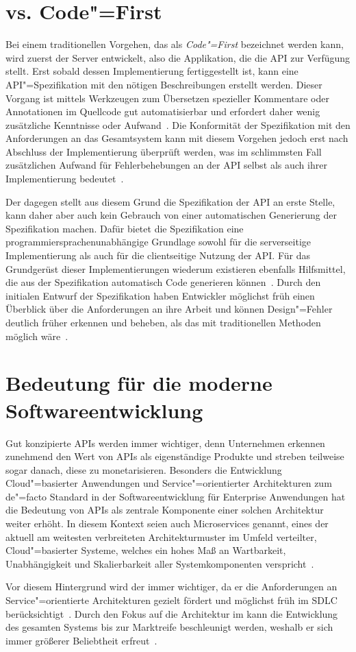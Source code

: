 \section{\AF vs. Code"=First}
Bei einem traditionellen Vorgehen, das als \emph{Code"=First} bezeichnet werden kann, wird zuerst der Server entwickelt, also die Applikation, die die \ac{API} zur Verfügung stellt.
Erst sobald dessen Implementierung fertiggestellt ist, kann eine \ac{API}"=Spezifikation mit den nötigen Beschreibungen erstellt werden.
Dieser Vorgang ist mittels Werkzeugen zum Übersetzen spezieller Kommentare oder Annotationen im Quellcode gut automatisierbar und erfordert daher wenig zusätzliche Kenntnisse oder Aufwand~\cite{ope24}.
Die Konformität der Spezifikation mit den Anforderungen an das Gesamtsystem kann mit diesem Vorgehen jedoch erst nach Abschluss der Implementierung überprüft werden, was im schlimmsten Fall zusätzlichen Aufwand für Fehlerbehebungen an der \ac{API} selbst als auch ihrer Implementierung bedeutet~\cite{vol22}.

Der \AFA dagegen stellt \ua aus diesem Grund die Spezifikation der \ac{API} an erste Stelle, kann daher aber auch kein Gebrauch von einer automatischen Generierung der Spezifikation machen.
Dafür bietet die Spezifikation eine programmiersprachenunabhängige Grundlage sowohl für die serverseitige Implementierung als auch für die clientseitige Nutzung der \ac{API}.
Für das Grundgerüst dieser Implementierungen wiederum existieren ebenfalls Hilfsmittel, die aus der Spezifikation automatisch Code generieren können~\cite{ope24}.
Durch den initialen Entwurf der Spezifikation haben Entwickler möglichst früh einen Überblick über die Anforderungen an ihre Arbeit und können Design"=Fehler deutlich früher erkennen und beheben, als das mit traditionellen Methoden möglich wäre~\cite[1627]{cha21}.

\section{Bedeutung für die moderne Softwareentwicklung}
Gut konzipierte \acp{API} werden immer wichtiger, denn Unternehmen erkennen zunehmend den Wert von \acp{API} als eigenständige Produkte und streben teilweise sogar danach, diese zu monetarisieren.
Besonders die Entwicklung Cloud"=basierter Anwendungen und Service"=orientierter Architekturen zum de"=facto Standard in der Softwareentwicklung für Enterprise Anwendungen hat die Bedeutung von \acp{API} als zentrale Komponente einer solchen Architektur weiter erhöht.
In diesem Kontext seien auch Microservices genannt, eines der aktuell am weitesten verbreiteten Architekturmuster im Umfeld verteilter, Cloud"=basierter Systeme, welches ein hohes Maß an Wartbarkeit, Unabhängigkeit und Skalierbarkeit aller Systemkomponenten verspricht~\cites[73-75]{bea22}[5]{kul23}.

Vor diesem Hintergrund wird der \AFA immer wichtiger, da er die Anforderungen an Service"=orientierte Architekturen gezielt fördert und möglichst früh im \ac{SDLC} berücksichtigt~\cite[1627]{cha21}.
Durch den Fokus auf die Architektur im \AFA kann die Entwicklung des gesamten Systems bis zur Marktreife beschleunigt werden, weshalb er sich immer größerer Beliebtheit erfreut~\cite[76]{bea22}.